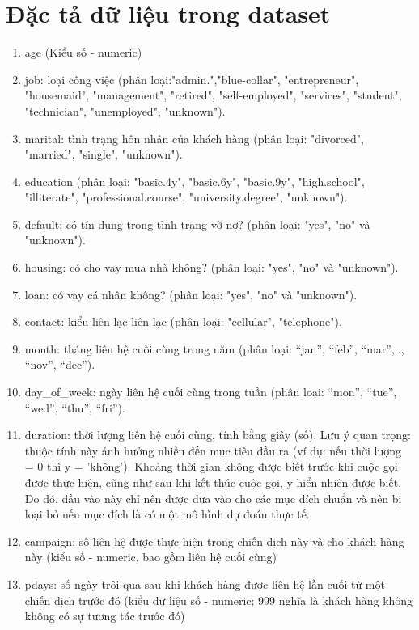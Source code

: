 \documentclass{report}
\begin{document}
\section{Đặc tả dữ liệu trong dataset}
    \fontsize{13}{10}\selectfont
    \begin{enumerate}
        \item age (Kiểu số - numeric)
        \item job: loại công việc (phân loại:"admin.","blue-collar", "entrepreneur", "housemaid", "management", "retired", "self-employed", "services", "student", "technician", "unemployed", "unknown").
        \item marital: tình trạng hôn nhân của khách hàng (phân loại: "divorced", "married", "single", "unknown").
        \item education (phân loại: "basic.4y", "basic.6y", "basic.9y", "high.school", "illiterate", "professional.course", "university.degree", "unknown").
        \item default: có tín dụng trong tình trạng vỡ nợ? (phân loại: "yes",  "no" và "unknown").
        \item housing: có cho vay mua nhà không? (phân loại: "yes",  "no" và "unknown").
        \item loan: có vay cá nhân không? (phân loại: "yes",  "no" và "unknown").
        \item contact: kiểu liên lạc liên lạc (phân loại: "cellular", "telephone").
        \item month: tháng liên hệ cuối cùng trong năm (phân loại: “jan”, “feb”, “mar”,.., “nov”, “dec”).
        \item day\_of\_week: ngày liên hệ cuối cùng trong tuần (phân loại: “mon”, “tue”, “wed”, “thu”, “fri”).
        \item duration: thời lượng liên hệ cuối cùng, tính bằng giây (số). Lưu ý quan trọng: thuộc tính này ảnh hưởng nhiều đến mục tiêu đầu ra (ví dụ: nếu thời lượng = 0 thì y = ’không’). Khoảng thời gian không được biết trước khi cuộc gọi được thực hiện, cũng như sau khi kết thúc cuộc gọi, y hiển nhiên được biết. Do đó, đầu vào này chỉ nên được đưa vào cho các mục đích chuẩn và nên bị loại bỏ nếu mục đích là có một mô hình dự đoán thực tế.
        \item campaign: số liên hệ được thực hiện trong chiến dịch này và cho khách hàng này (kiểu số - numeric, bao gồm liên hệ cuối cùng)
        \item pdays: số ngày trôi qua sau khi khách hàng được liên hệ lần cuối từ một chiến dịch trước đó (kiểu dữ liệu số - numeric; 999 nghĩa là khách hàng không không có sự tương tác trước đó)

\end{enumerate}
\end{document}
